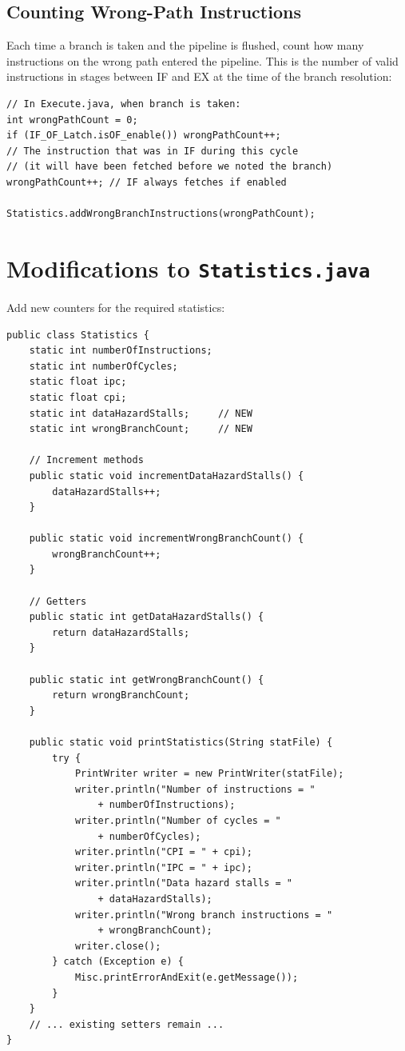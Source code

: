 \documentclass[12pt,a4paper]{article}
\begin{document}
\subsection{Counting Wrong-Path Instructions}

Each time a branch is taken and the pipeline is flushed, count how many instructions on the wrong path entered the pipeline. This is the number of valid instructions in stages between IF and EX at the time of the branch resolution:

\begin{lstlisting}[style=javastyle, caption={Counting wrong branch entries}]
// In Execute.java, when branch is taken:
int wrongPathCount = 0;
if (IF_OF_Latch.isOF_enable()) wrongPathCount++;
// The instruction that was in IF during this cycle
// (it will have been fetched before we noted the branch)
wrongPathCount++; // IF always fetches if enabled

Statistics.addWrongBranchInstructions(wrongPathCount);
\end{lstlisting}

\section{Modifications to \texttt{Statistics.java}}

Add new counters for the required statistics:

\begin{lstlisting}[style=javastyle, caption={Updated \texttt{Statistics.java}}]
public class Statistics {
    static int numberOfInstructions;
    static int numberOfCycles;
    static float ipc;
    static float cpi;
    static int dataHazardStalls;     // NEW
    static int wrongBranchCount;     // NEW

    // Increment methods
    public static void incrementDataHazardStalls() {
        dataHazardStalls++;
    }

    public static void incrementWrongBranchCount() {
        wrongBranchCount++;
    }

    // Getters
    public static int getDataHazardStalls() {
        return dataHazardStalls;
    }

    public static int getWrongBranchCount() {
        return wrongBranchCount;
    }

    public static void printStatistics(String statFile) {
        try {
            PrintWriter writer = new PrintWriter(statFile);
            writer.println("Number of instructions = "
                + numberOfInstructions);
            writer.println("Number of cycles = "
                + numberOfCycles);
            writer.println("CPI = " + cpi);
            writer.println("IPC = " + ipc);
            writer.println("Data hazard stalls = "
                + dataHazardStalls);
            writer.println("Wrong branch instructions = "
                + wrongBranchCount);
            writer.close();
        } catch (Exception e) {
            Misc.printErrorAndExit(e.getMessage());
        }
    }
    // ... existing setters remain ...
}
\end{lstlisting}
\end{document}
